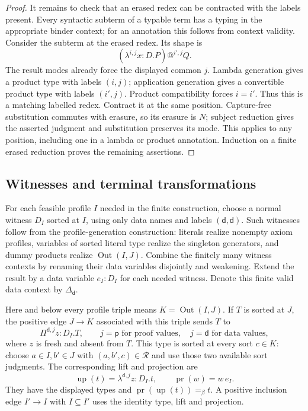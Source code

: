 \begin{proof}
It remains to check that an erased redex can be contracted with the labels
present.  Every syntactic subterm of a typable term has a typing in the
appropriate binder context; for an annotation this follows from context
validity.  Consider the subterm at the erased redex.  Its shape is
\[
 (\lambda^{i,j}x:D.P)\mathbin{@^{i',j}}Q.
\]
The result modes already force the displayed common $j$.  Lambda generation
gives a product type with labels $(i,j)$; application generation gives a
convertible product type with labels $(i',j)$.  Product compatibility forces
$i=i'$.  Thus this is a matching labelled redex.  Contract it at the same
position.  Capture-free substitution commutes with erasure, so its erasure
is $N$; subject reduction gives the asserted judgment and substitution
preserves its mode.  This applies to any position, including one in a
lambda or product annotation.  Induction on a finite erased reduction proves
the remaining assertions.
\end{proof}

\subsection{Witnesses and terminal transformations}
For each feasible profile $I$ needed in the finite construction, choose a
normal witness $D_I$ sorted at $I$, using only data names and labels
$(\mathsf d,\mathsf d)$.  Such witnesses follow from the profile-generation
construction: literals realize nonempty axiom profiles, variables of sorted
literal type realize the singleton generators, and dummy products realize
$\operatorname{Out}(I,J)$.  Combine the finitely many witness contexts by
renaming their data variables disjointly and weakening.  Extend the result
by a data variable $e_I:D_I$ for each needed witness.  Denote this finite
valid data context by $\Delta_{\mathsf d}$.

Here and below every profile triple means
$K=\operatorname{Out}(I,J)$.  If $T$ is sorted at $J$, the positive edge
$J\longrightarrow K$ associated with this triple sends $T$ to
\[
   \Pi^{\mathsf d,j}z:D_I.T,
   \qquad j=\mathsf p\text{ for proof values},\quad
          j=\mathsf d\text{ for data values},
\]
where $z$ is fresh and absent from $T$.  This type is sorted at every sort
$c\in K$: choose $a\in I,b'\in J$ with $(a,b',c)\in\mathcal R$ and use
those two available sort judgments.  The corresponding lift and projection
are
\[
    \operatorname{up}(t)=\lambda^{\mathsf d,j}z:D_I.t,
    \qquad \operatorname{pr}(w)=w\,e_I.
\]
They have the displayed types and
$\operatorname{pr}(\operatorname{up}(t))=_\beta t$.
A positive inclusion edge $I'\longrightarrow I$ with $I\subseteq I'$
uses the identity type, lift and projection.

